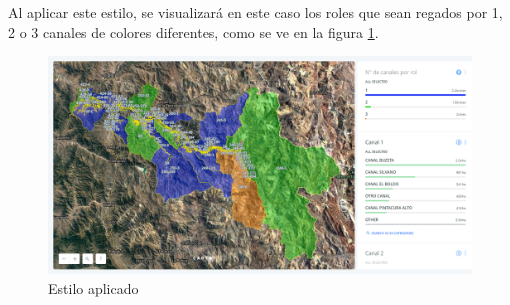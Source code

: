 \documentclass[10pt]{article}
\begin{document}
\begin{enumerate}
Al aplicar este estilo, se visualizará en este caso los roles que sean regados por 1, 2 o 3 canales de colores diferentes, como se ve en la figura \ref{estilocolor}.


\begin{figure}[H]
\centering
\includegraphics[scale=0.5]{Figuras_manual/visor_estilo.png}
\caption{Estilo aplicado}
\label{estilocolor}
\end{figure}



\end{enumerate}
\end{document}
